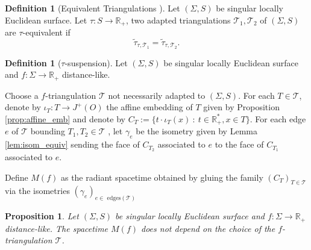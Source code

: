 \documentclass[a4paper,12pt]{article}
\def\TT{\mathcal T}
\def\RR{\mathbb{R}}
\newcommand{\tautilde}[2]{\widetilde\tau_{#1,#2}}
\newtheorem{prop}[lem]{Proposition}
\theoremstyle{definition}
\newtheorem{defi}[lem]{Definition}	%
\begin{document}
							\begin{defi}[Equivalent Triangulations ]\label{defi:triang_equi}
							Let $(\Sigma, S)$ be singular locally Euclidean surface.
								Let $\tau:S\rightarrow \RR_+$,
								two adapted triangulations $\TT_1,\TT_2$ of $(\Sigma, S)$ are $\tau$-equivalent if 
								$$\tautilde{\tau}{\TT_1}=\tautilde{\tau}{\TT_2}.$$
							\end{defi}


							\begin{defi}[$\tau$-suspension] \label{defi:tau_susp}
							Let $(\Sigma, S)$ be singular locally Euclidean surface and 
							$f: \Sigma \rightarrow \RR_+$ distance-like. 
	
							Choose a $f$-triangulation $\TT$ not necessarily adapted to $(\Sigma, S)$.
							For each $T\in \TT$, denote by $\iota_T:T\rightarrow J^+(O)$ the affine embedding of $T$ given by Proposition \ref{prop:affine_emb} and denote by $C_T:=\{t\cdot\iota_T(x) ~:~ t\in \RR_+^*, x\in T\}$. For each edge $e$ of $\TT$ bounding $T_1,T_2 \in \TT$ , let $\gamma_e$ be the isometry given by Lemma \ref{lem:isom_equiv} sending the face of $C_{T_2}$ associated to $e$ to the face of $C_{T_1}$ associated to $e$.
							
							
							
							Define $M(f)$ as the radiant spacetime obtained by gluing the family $(C_T)_{T\in \TT}$ via the isometries $(\gamma_e)_{e \in \text{ edges}(\TT)}$ 
							\end{defi}

							
							\begin{prop}\label{prop:Mtautilde}
							 Let $(\Sigma, S)$ be singular locally Euclidean surface and 
							$f: \Sigma \rightarrow \RR_+$ distance-like. The spacetime $M(f)$ does not depend on the choice of the $f$-triangulation $\TT$.							 
							\end{prop}
							
\end{document}

